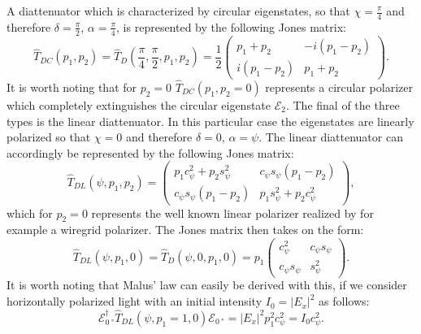 A diattenuator which is characterized by circular eigenstates, so that $\chi=\frac{\pi}{4}$ and therefore $\delta=\frac{\pi}{2}$, $\alpha=\frac{\pi}{4}$, is represented by the following Jones matrix:
\begin{equation}
    \hat{T}_{DC}(p_1, p_2) = \hat{T}_D\left(\frac{\pi}{4}, \frac{\pi}{2}, p_1, p_2\right) =
    \frac{1}{2}
    \begin{pmatrix} 
    p_1 + p_2 & -i(p_1 - p_2) \\
    i(p_1 - p_2) & p_1 + p_2
    \end{pmatrix}.
\end{equation}
It is worth noting that for $p_2=0$ $\hat{T}_{DC}(p_1, p_2=0)$ represents a circular polarizer which completely extinguishes the circular eigenstate $\bm{\mathcal{E}}_2$. The final of the three types is the linear diattenuator. In this particular case the eigenstates are linearly polarized so that $\chi=0$ and therefore $\delta=0$, $\alpha=\psi$. The linear diattenuator can accordingly be represented by the following Jones matrix:
\begin{equation}
    \hat{T}_{DL}(\psi, p_1, p_2) = 
    \begin{pmatrix} 
    p_1c_{\psi}^2 + p_2s_{\psi}^2 & c_{\psi}s_{\psi}(p_1 - p_2) \\
    c_{\psi}s_{\psi}(p_1 - p_2) & p_1s_{\psi}^2 + p_2c_{\psi}^2
    \end{pmatrix},
\end{equation}
which for $p_2=0$ represents the well known linear polarizer realized by for example a wiregrid polarizer. The Jones matrix then takes on the form:
\begin{equation}
    \hat{T}_{DL}(\psi, p_1, 0) = \hat{T}_{D}(\psi, 0, p_1, 0) =
    p_1
    \begin{pmatrix} 
    c_{\psi}^2 & c_{\psi}s_{\psi} \\
    c_{\psi}s_{\psi} & s_{\psi}^2
    \end{pmatrix}.
\end{equation}
It is worth noting that Malus' law can easily be derived with this, if we consider horizontally polarized light with an initial intensity $I_0=|E_x|^2$ as follows:
\begin{equation}
    \bm{\mathcal{E}}_{\SI{0}{\degree}}^{\dagger}
    \hat{T}_{DL}(\psi, p_1=1, 0)\bm{\mathcal{E}}_{\SI{0}{\degree}} = |E_x|^2p_1^2c_{\psi}^2 = I_0 c_{\psi}^2.
\end{equation}

